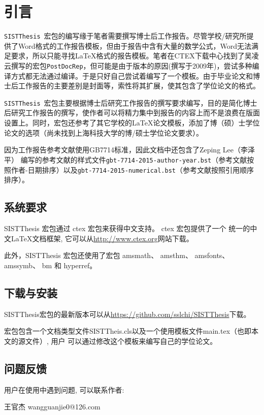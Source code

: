 \chapter{引言}
\texttt{SISTThesis}~宏包的编写缘于笔者需要撰写博士后工作报告。尽管学校/研究所提供了Word格式的工作报告模板，但由于报告中含有大量的数学公式，Word无法满足要求，所以只能寻找\LaTeX 格式的报告模板。笔者在CTEX下载中心找到了吴凌云撰写的宏包\texttt{PostDocRep}，但可能是由于版本的原因(撰写于2009年)，尝试多种编译方式都无法通过编译。于是只好自己尝试着编写了一个模板。由于毕业论文和博士后工作报告的主要差别是封面等，索性将其扩展，使其包含了学位论文的格式。

\texttt{SISTThesis}~宏包主要根据博士后研究工作报告的撰写要求编写，目的是简化博士后研究工作报告的撰写，使作者可以将精力集中到报告的内容上而不是浪费在版面设置上。同时，宏包还参考了其它学校的\LaTeX 论文模板，添加了博（硕）士学位论文的选项（尚未找到上海科技大学的博/硕士学位论文要求）。

因为工作报告参考文献使用GB7714标准，因此文档中还包含了Zeping Lee（李泽平） 编写的参考文献的样式文件\verb|gbt-7714-2015-author-year.bst|（参考文献按照作者-日期排序）以及\verb|gbt-7714-2015-numerical.bst|（参考文献按照引用顺序排序）。
\section{系统要求}
SISTThesis 宏包通过 ctex 宏包来获得中文支持。 ctex 宏包提供了一个
统一的中文\LaTeX 文档框架, 它可以从\url{http://www.ctex.org}网站下载。

此外，SISTThesis 宏包还使用了宏包 amsmath、 amsthm、 amsfonts、
amssymb、 bm 和 hyperref。
\section{下载与安装}
SISTThesis宏包的最新版本可以从\url{https://github.com/sslchi/SISTThesis}下载。

宏包包含一个文档类型文件SISTTheis.cls以及一个使用模板文件main.tex（也即本文的源文件）, 用户
可以通过修改这个模板来编写自己的学位论文。
\section{问题反馈}
用户在使用中遇到问题, 可以联系作者:
\begin{center}
    王官杰 \qquad \qquad wangguanjie0@126.com
\end{center}